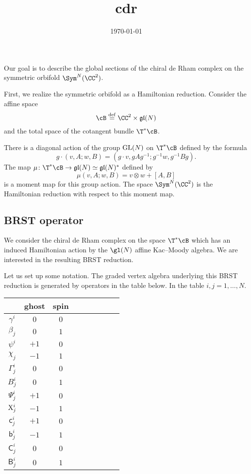 \documentclass[11pt]{amsart}
\date{\today}
\title{cdr}
\def\define{\overset{\rm def}{=}}
\def\fgl{{\mathfrak{gl}}}
\def\GL{{\rm GL}}
\def\sfc{{\mathsf{c}}}
\def\sfb{{\mathsf{b}}}
\def\sfB{{\mathsf{B}}}
\def\sfC{{\mathsf{C}}}
\begin{document}
\maketitle


Our goal is to describe the global sections of the chiral de Rham complex on the symmetric orbifold $\Sym^N (\CC^2)$. 

First, we realize the symmetric orbifold as a Hamiltonian reduction. 
Consider the affine space
\[
\cB \define \CC^2 \times \fgl(N) 
\]
and the total space of the cotangent bundle $\T^* \cB$.

There is a diagonal action of the group $\GL(N)$ on $\T^*\cB$ defined by the formula
\[
g \cdot (v, A ; w, B) = (g \cdot v, g A g^{-1} ; g^{-1} w, g^{-1} B g) .
\]
The map $\mu \colon \T^* \cB \to \fgl(N) \simeq \fgl(N)^*$ defined by
\begin{equation}\label{eqn:moment}
\mu (v, A ; w, B) = v \otimes w + [A,B] 
\end{equation}
is a moment map for this group action. 
The space $\Sym^N (\CC^2)$ is the Hamiltonian reduction with respect to this moment map. 

\subsection{BRST operator}
We consider the chiral de Rham complex on the space $\T^*\cB$ which has an induced Hamiltonian action by the $\gl(N)$ affine Kac--Moody algebra. 
We are interested in the resulting BRST reduction. 

Let us set up some notation. 
The graded vertex algebra underlying this BRST reduction is generated by operators in the table below. 
In the table $i,j = 1,\ldots, N$. 

\begin{table}
\begin{tabular}{c|c|c|cccccc}
& {\rm ghost} & {\rm spin} \\
\hline
$\gamma^i$ & $0$ &  $0$ \\
$ \beta_j$ & $0$ &  $1$ \\
\hline
$\psi^i$ & $+1$ &  $0$ \\
$\chi_j $ & $-1$ &  $1$ \\
\hline
$\Gamma^i_j$ & $0$ &  $0$ \\
$ B^i_j $ & $0$ &  $1$ \\
\hline
$\Psi^i_j$ & $+1$ &  $0$ \\
$ {\rm X}^i_j $ & $-1$ &  $1$ \\
\hline
$\sfc^i_j$ & $+1$ &  $0$ \\
$ \sfb^i_j $ & $-1$ &  $1$ \\
\hline
$\sfC^i_j$ & $0$ &  $0$ \\
$ \sfB^i_j $ & $0$ &  $1$ \\
\end{tabular}
\end{table}
\end{document}
